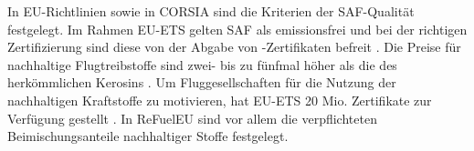 %
%
%
%
%
%
In EU-Richtlinien sowie in CORSIA sind die Kriterien der SAF-Qualität festgelegt.
Im Rahmen EU-ETS gelten SAF als emissionsfrei und bei der richtigen Zertifizierung 
sind diese von der Abgabe von -Zertifikaten befreit \cite{icao_saf_conversion_2024}. 
Die Preise für nachhaltige Flugtreibstoffe sind zwei- bis zu fünfmal höher 
als die des herkömmlichen Kerosins \cite{iata_saf_2024}. %
Um Fluggesellschaften für die Nutzung der nachhaltigen Kraftstoffe zu motivieren, hat EU-ETS
20 Mio. Zertifikate zur Verfügung gestellt \cite{icao_saf_conversion_2024}. 
In ReFuelEU sind vor allem die verpflichteten Beimischungsanteile nachhaltiger Stoffe festgelegt.


